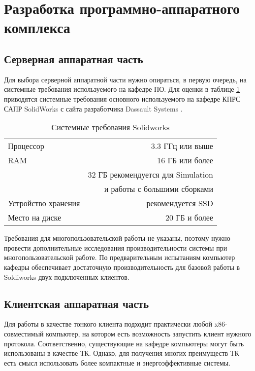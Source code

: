 \section{Разработка программно-аппаратного комплекса}

\subsection{Серверная аппаратная часть}
Для выбора серверной аппаратной части нужно опираться, в первую очередь, на системные
требования используемого на кафедре ПО. Для оценки в таблице \ref{tab:solid_req}
приводятся системные требования основного используемого на кафедре КПРС САПР SolidWorks
с сайта разработчика Dassault Systems \cite{ref:solid_req2} \cite{ref:solid_req1}.

\begin{table}[htpb]
    \centering
    \caption{Системные требования Solidworks}
    \label{tab:solid_req}
    \begin{tabularx}{\linewidth}{Xr}
        \toprule
        Процессор & 3.3 ГГц или выше \\
        RAM & 16 ГБ или более \\
            & 32 ГБ рекомендуется для Simulation \\
            & и работы с большими сборками \\
        Устройство хранения & рекомендуется SSD \\
        Место на диске & 20 ГБ и более \\
        \bottomrule
    \end{tabularx}
\end{table}

Требования для многопользовательской работы не указаны, поэтому нужно провести
дополнительные исследования производительности системы при многопользовательской работе.
По предварительным испытаниям компьютер кафедры обеспечивает достаточную
производительность для базовой работы в Soldiworks двух подключенных клиентов.

\subsection{Клиентская аппаратная часть}
Для работы в качестве тонкого клиента подходит практически любой x86-совместимый
компьютер, на котором есть возможность запустить клиент нужного протокола.
Соответственно, существующие на кафедре компьютеры могут быть использованы в качестве
ТК. Однако, для получения многих преимуществ ТК есть смысл использовать более
компактные и энергоэффективные системы.

